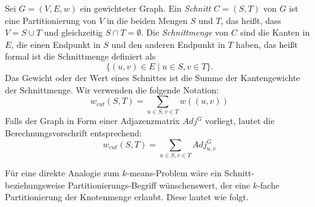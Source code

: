\begin{definition}
	Sei $G=(V,E,w)$ ein gewichteter Graph. Ein \emph{Schnitt} $C=(S,T)$ von $G$ ist eine Partitionierung von $V$ in die beiden
	Mengen $S$ und $T$, das heißt, dass $V = S \cup T$ und gleichzeitig $S \cap T = \emptyset$.
	Die \emph{Schnittmenge} von $C$ sind die Kanten in $E$, die einen
	Endpunkt in $S$ und den anderen Endpunkt in $T$ haben, das heißt formal ist die Schnittmenge definiert als
	\[ \{ (u,v) \in E \mid u \in S, v \in T \}. \]
	Das Gewicht oder der Wert eines Schnittes ist die Summe der Kantengewichte der Schnittmenge. Wir verwenden die folgende
	Notation:
	\[ w_{cut}(S,T) = \sum_{u \in S, v \in T} w((u,v)) \]
	Falls der Graph in Form einer Adjazenzmatrix $Adj^G$ vorliegt, lautet die Berechnungsvorschrift entsprechend:
	\[ w_{cut}(S,T) = \sum_{u \in S, v \in T} Adj^G_{u,v} \]
\end{definition}
Für eine direkte Analogie zum $k$-means-Problem wäre ein Schnitt- beziehungsweise Partitionierungs-Begriff wünschenswert,
der eine $k$-fache Partitionierung der Knotenmenge erlaubt. Diese lautet wie folgt.

